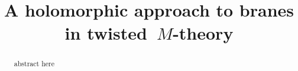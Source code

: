 \documentclass[11pt]{amsart}
\begin{document}
\title{A holomorphic approach to branes in twisted~$M$-theory}
\maketitle

\begin{abstract}
abstract here
\end{abstract}

\tableofcontents











 
 


\end{document}
